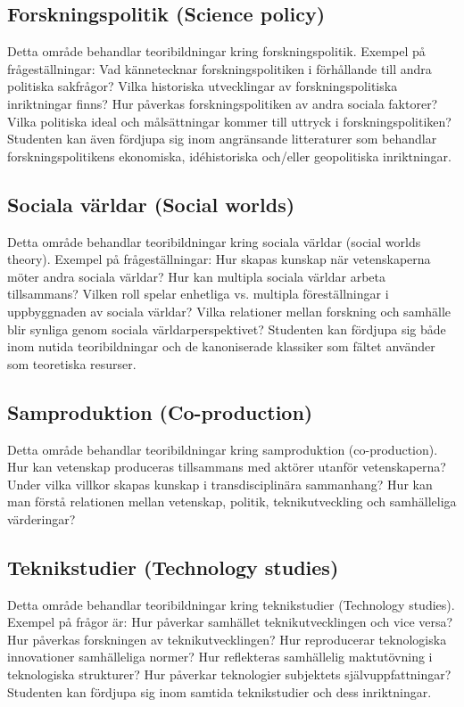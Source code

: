 \documentclass[12pt,a4paper]{article}
\begin{document}
\subsection{Forskningspolitik (Science policy)}
Detta område behandlar teoribildningar kring forskningspolitik. Exempel på frågeställningar: Vad kännetecknar forskningspolitiken i förhållande till andra politiska sakfrågor? Vilka historiska utvecklingar av forskningspolitiska inriktningar finns? Hur påverkas forskningspolitiken av andra sociala faktorer? Vilka politiska ideal och målsättningar kommer till uttryck i forskningspolitiken? Studenten kan även fördjupa sig inom angränsande litteraturer som behandlar forskningspolitikens ekonomiska, idéhistoriska och/eller geopolitiska inriktningar. 

\subsection{Sociala världar (Social worlds)}
Detta område behandlar teoribildningar kring sociala världar (social worlds theory). Exempel på frågeställningar: Hur skapas kunskap när vetenskaperna möter andra sociala världar? Hur kan multipla sociala världar arbeta tillsammans? Vilken roll spelar enhetliga vs. multipla föreställningar i uppbyggnaden av sociala världar? Vilka relationer mellan forskning och samhälle blir synliga genom sociala världarperspektivet? Studenten kan fördjupa sig både inom nutida teoribildningar och de kanoniserade klassiker som fältet använder som teoretiska resurser. 

\subsection{Samproduktion (Co-production)} 
Detta område behandlar teoribildningar kring samproduktion (co-production). Hur kan vetenskap produceras tillsammans med aktörer utanför vetenskaperna? Under vilka villkor skapas kunskap i transdisciplinära sammanhang? Hur kan man förstå relationen mellan vetenskap, politik, teknikutveckling och samhälleliga värderingar? 

\subsection{Teknikstudier (Technology studies)}
 Detta område behandlar teoribildningar kring teknikstudier (Technology studies). Exempel på frågor är: Hur påverkar samhället teknikutvecklingen och vice versa? Hur påverkas forskningen av teknikutvecklingen? Hur reproducerar teknologiska innovationer samhälleliga normer? Hur reflekteras samhällelig maktutövning i teknologiska strukturer? Hur påverkar teknologier subjektets självuppfattningar? Studenten kan fördjupa sig inom samtida teknikstudier och dess inriktningar. 
\end{document}
